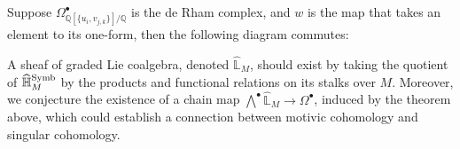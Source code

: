 \begin{theorem*}
Suppose $\Omega^\bullet_{\mathbb Q[\{u_i,v_{j,k}\}]/\mathbb Q}$ is the de Rham complex, and $w$ is the map that takes an element to its one-form, then the following diagram commutes:
\begin{center}
\end{center}
\end{theorem*}

A sheaf of graded Lie coalgebra, denoted $\widehat{\mathbb L}_M$, should exist by taking the quotient of $\widehat{\mathbb H}^{\operatorname{Symb}}_M$ by the products and functional relations on its stalks over $M$. Moreover, we conjecture the existence of a chain map $\bigwedge^\bullet\widehat{\mathbb L}_M\to\Omega^\bullet$, induced by the theorem above, which could establish a connection between motivic cohomology and singular cohomology.

